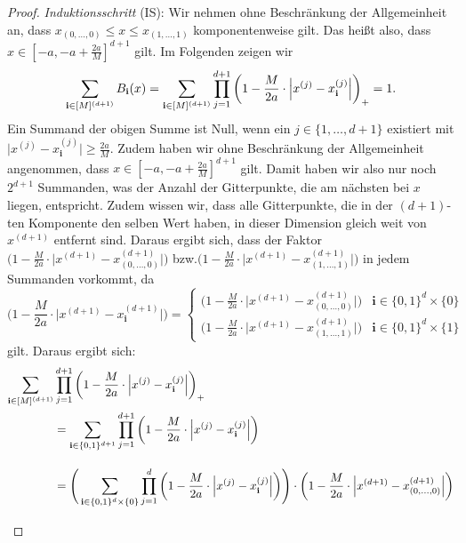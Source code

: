 \begin{proof}
\emph{Induktionsschritt} (IS): Wir nehmen ohne Beschränkung der Allgemeinheit an, dass $x_{(0,\dots,0)} \leq x \leq x_{(1,\dots,1)}$ komponentenweise gilt. Das heißt also, dass $x \in [-a, -a + \frac{2a}{M}]^{d + 1}$ gilt. Im Folgenden zeigen wir $$\sum_{\mathbf{i} \in [M]^{(d + 1)}} B_{\mathbf{i}}(x) = \sum_{\mathbf{i} \in [M]^{(d + 1)}}\prod_{j = 1}^{d + 1} \bigg(1 - \frac{M}{2a} \cdot \Big|x^{(j)} - x_{\mathbf{i}}^{(j)}\Big|\bigg)_+ = 1.$$
Ein Summand der obigen Summe ist Null, wenn ein $j \in \{1,\dots,d+1\}$ existiert mit $\big|x^{(j)} - x_{\mathbf{i}}^{(j)}\big| \geq \frac{2a}{M}$. Zudem haben wir ohne Beschränkung der Allgemeinheit angenommen, dass $x \in [-a, -a + \frac{2a}{M}]^{d + 1}$ gilt. Damit haben wir also nur noch $2^{d + 1}$ Summanden, was der Anzahl der Gitterpunkte, die am nächsten bei $x$ liegen, entspricht. Zudem wissen wir, dass alle Gitterpunkte, die in der $(d + 1)$-ten Komponente den selben Wert haben, in dieser Dimension gleich weit von $x^{(d + 1)}$ entfernt sind. Daraus ergibt sich, dass der Faktor $\big(1 - \frac{M}{2a} \cdot \big|x^{(d + 1)} - x_{(0,\dots,0)}^{(d + 1)}\big|\big)$ bzw.\@ $\big(1 - \frac{M}{2a} \cdot \big|x^{(d + 1)} - x_{(1,\dots,1)}^{(d + 1)}\big|\big)$ in jedem Summanden vorkommt, da 
\begin{equation*}
\Big(1 - \frac{M}{2a} \cdot \Big|x^{(d + 1)} - x_\mathbf{i}^{(d + 1)}\Big|\Big) = \begin{cases}
\Big(1 - \frac{M}{2a} \cdot \Big|x^{(d + 1)} - x_{(0,\dots,0)}^{(d + 1)}\Big|\Big) &\text{$\mathbf{i} \in \{0, 1\}^d \times \{0\}$}\\[0.5em]
\Big(1 - \frac{M}{2a} \cdot \Big|x^{(d + 1)} - x_{(1,\dots,1)}^{(d + 1)}\Big|\Big) &\text{$\mathbf{i} \in \{0, 1\}^d \times \{1\}$}
\end{cases}
\end{equation*}
gilt. Daraus ergibt sich:
\begin{equation*}
\begin{split}
\sum_{\bi \in [M]^{(d + 1)}} & \prod_{j = 1}^{d + 1} \bigg(1 - \frac{M}{2a} \cdot \Big|x^{(j)} - x_{\mathbf{i}}^{(j)}\Big|\bigg)_+ \\
& = \sum_{\mathbf{i} \in \{0, 1\}^{d + 1}} \prod_{j = 1}^{d + 1} \bigg(1 - \frac{M}{2a} \cdot \Big|x^{(j)} - x_{\bi}^{(j)}\Big|\bigg) \\[1em]
& = \Bigg(\sum_{\mathbf{i} \in \{0, 1\}^d \times \{0\}} \prod_{j = 1}^{d} \bigg(1 - \frac{M}{2a} \cdot \Big|x^{(j)} - x_{\bi}^{(j)}\Big|\bigg)\Bigg) \cdot \bigg(1 - \frac{M}{2a} \cdot \Big|x^{(d + 1)} - x_{(0,\dots,0)}^{(d + 1)}\Big|\bigg) \\[0.5em]

\end{split}
\end{equation*}
\end{proof}
